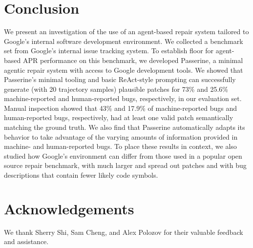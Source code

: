 \section{Conclusion}
We present an investigation of the use of an agent-based repair system tailored to Google’s internal software development environment. We collected a benchmark set from Google's internal issue tracking system.
To establish floor for agent-based APR performance on this benchmark, 
we developed Passerine, a minimal agentic repair system with access to Google development tools. We showed that Passerine’s minimal tooling and basic ReAct-style prompting can successfully generate (with 20 trajectory samples) 
plausible patches for 73\% and 25.6\% machine-reported
and human-reported bugs, respectively,
in our evaluation set. Manual inspection showed that 
43\% and 17.9\% of machine-reported bugs 
and human-reported bugs, respectively, had at least one valid patch semantically matching the ground truth. We also find that Passerine automatically adapts its behavior to take advantage of the varying amounts of information provided in machine- and human-reported bugs.
To place these results in context, we also studied how Google's environment can differ from those used in a popular open source repair benchmark, with much larger and spread out patches and with bug descriptions that contain fewer likely code symbols. 


\section{Acknowledgements}
We thank Sherry Shi, Sam Cheng, and Alex Polozov for their valuable feedback and assistance.
